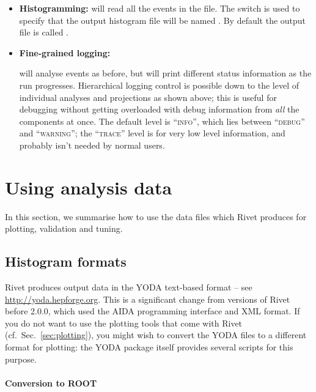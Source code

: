 \begin{itemize}
\item \textbf{Histogramming: }{ will read all the
    events in the  file. The  switch is used to
    specify that the output histogram file will be named . By
    default the output file is called .}

\item \textbf{Fine-grained logging: }

  {
    will analyse events as before, but will print different status
    information as the run progresses. Hierarchical logging control is possible
    down to the level of individual analyses and projections as shown above;
    this is useful for debugging without getting overloaded with debug
    information from \emph{all} the components at once. The default level is
    ``\textsc{info}'', which lies between ``\textsc{debug}'' and
    ``\textsc{warning}''; the ``\textsc{trace}'' level is for very low level
    information, and probably isn't needed by normal users.}

\end{itemize}



\section{Using analysis data}

In this section, we summarise how to use the data files which Rivet produces for
plotting, validation and tuning.

\subsection{Histogram formats}

Rivet produces output data in the YODA text-based format -- see
\url{http://yoda.hepforge.org}. This is a significant change from versions of
Rivet before 2.0.0, which used the AIDA programming interface and XML format. If
you do not want to use the plotting tools that come with Rivet (cf.\
Sec.~\ref{sec:plotting}), you might wish to convert the YODA files to a
different format for plotting: the YODA package itself provides several scripts
for this purpose.

\paragraph{Conversion to ROOT}

